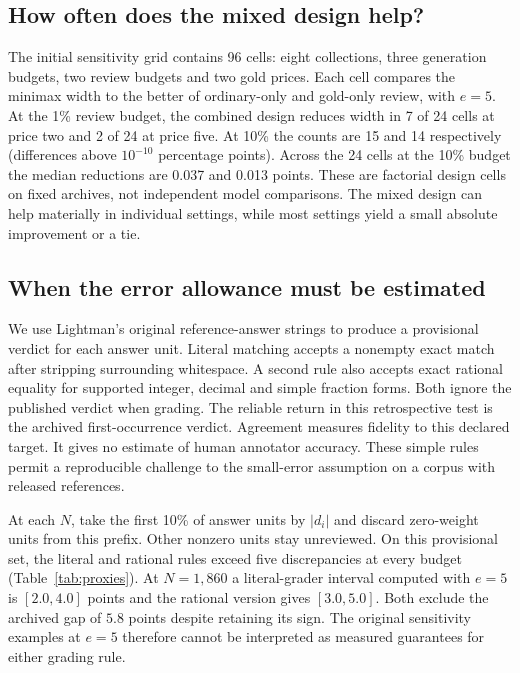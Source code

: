 \subsection{How often does the mixed design help?}
The initial sensitivity grid contains 96 cells: eight collections, three generation budgets, two review budgets and two gold prices. Each cell compares the minimax width to the better of ordinary-only and gold-only review, with $e=5$. At the 1\% review budget, the combined design reduces width in 7 of 24 cells at price two and 2 of 24 at price five. At 10\% the counts are 15 and 14 respectively (differences above $10^{-10}$ percentage points). Across the 24 cells at the 10\% budget the median reductions are 0.037 and 0.013 points. These are factorial design cells on fixed archives, not independent model comparisons. The mixed design can help materially in individual settings, while most settings yield a small absolute improvement or a tie.

\subsection{When the error allowance must be estimated}\label{sec:calibration}
We use Lightman's original reference-answer strings to produce a provisional verdict for each answer unit. Literal matching accepts a nonempty exact match after stripping surrounding whitespace. A second rule also accepts exact rational equality for supported integer, decimal and simple fraction forms. Both ignore the published verdict when grading. The reliable return in this retrospective test is the archived first-occurrence verdict. Agreement measures fidelity to this declared target. It gives no estimate of human annotator accuracy. These simple rules permit a reproducible challenge to the small-error assumption on a corpus with released references.

At each $N$, take the first 10\% of answer units by $|d_i|$ and discard zero-weight units from this prefix. Other nonzero units stay unreviewed. On this provisional set, the literal and rational rules exceed five discrepancies at every budget (Table~\ref{tab:proxies}). At $N=1{,}860$ a literal-grader interval computed with $e=5$ is $[2.0,4.0]$ points and the rational version gives $[3.0,5.0]$. Both exclude the archived gap of $5.8$ points despite retaining its sign. The original sensitivity examples at $e=5$ therefore cannot be interpreted as measured guarantees for either grading rule.

